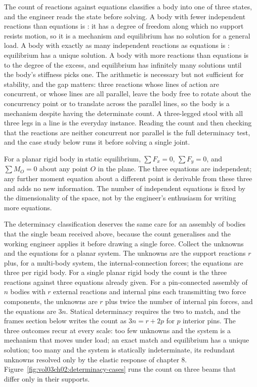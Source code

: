 The count of reactions against equations classifies a body into one of
three states, and the engineer reads the state before solving. A body
with fewer independent reactions than equations is : it
has a degree of freedom along which no support resists motion, so it is a
mechanism and equilibrium has no solution for a general load. A body with
exactly as many independent reactions as equations is : equilibrium has a unique solution. A body with more
reactions than equations is  to the
degree of the excess, and equilibrium has infinitely many solutions until
the body's stiffness picks one. The arithmetic is necessary but not
sufficient for stability, and the gap matters: three reactions whose
lines of action are concurrent, or whose lines are all parallel, leave
the body free to rotate about the concurrency point or to translate
across the parallel lines, so the body is a mechanism despite having the
determinate count. A three-legged stool with all three legs in a line is
the everyday instance. Reading the count and then checking that the
reactions are neither concurrent nor parallel is the full determinacy
test, and the case study below runs it before solving a single joint.

\begin{principle}
For a planar rigid body in static equilibrium, $\sum F_x = 0$, $\sum
F_y = 0$, and $\sum M_O = 0$ about any point $O$ in the plane. The
three equations are independent; any further moment equation about a
different point is derivable from these three and adds no new
information. The number of independent equations is fixed by the
dimensionality of the space, not by the engineer's enthusiasm for
writing more equations.
\end{principle}

The determinacy classification deserves the same care for an assembly of
bodies that the single beam received above, because the count generalises
and the working engineer applies it before drawing a single force.
Collect the unknowns and the equations for a planar system. The unknowns
are the support reactions $r$ plus, for a multi-body system, the
internal-connection forces; the equations are three per rigid body. For a
single planar rigid body the count is the three reactions against three
equations already given. For a pin-connected assembly of $n$ bodies with
$r$ external reactions and internal pins each transmitting two force
components, the unknowns are $r$ plus twice the number of internal pin
forces, and the equations are $3n$. Statical determinacy requires the two
to match, and the frames section below writes the count as $3n = r + 2p$
for $p$ interior pins. The three outcomes recur at every scale: too few
unknowns and the system is a mechanism that moves under load; an exact
match and equilibrium has a unique solution; too many and the system is
statically indeterminate, its redundant unknowns resolved only by the
elastic response of chapter 8.
Figure~\ref{fig:vol03ch02:determinacy-cases} runs the count on three
beams that differ only in their supports.

